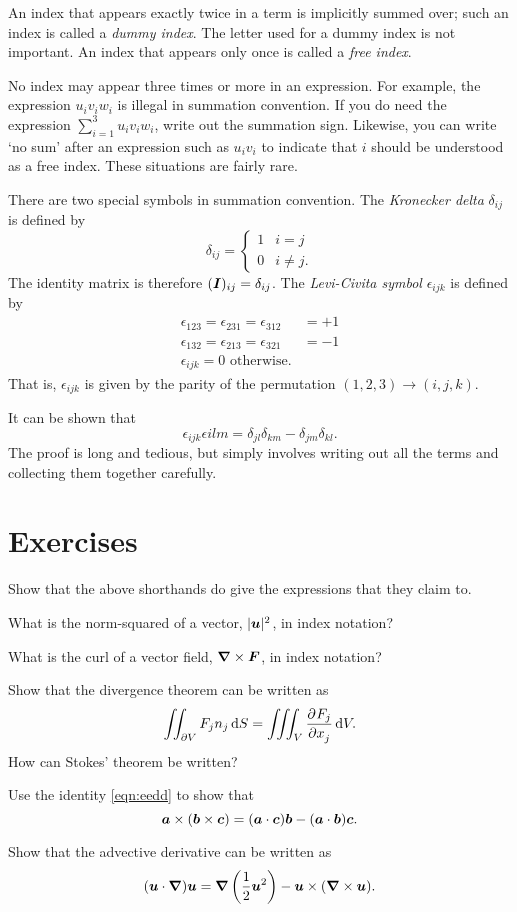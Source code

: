 \documentclass{article}
\begin{document}
An index that appears exactly twice in a term is implicitly summed over; such an index is called a \textit{dummy index}. The letter used for a dummy index is not important. An index that appears only once is called a \textit{free index}. 

No index may appear three times or more in an expression. For example, the expression $u_iv_iw_i$ is illegal in summation convention. If you do need the expression $\sum_{i=1}^3 u_iv_iw_i$, write out the summation sign. Likewise, you can write `no sum' after an expression such as $u_i v_i$ to indicate that $i$ should be understood as a free index. These situations are fairly rare.

There are two special symbols in summation convention. The \textit{Kronecker delta} $\delta_{ij}$ is defined by
\begin{equation}
 \delta_{ij} = \begin{cases}
  1 & i = j \\
  0 & i\neq j.
 \end{cases}
\end{equation}
The identity matrix is therefore $(\boldsymbol{I})_{ij} = \delta_{ij}$. The \textit{Levi-Civita symbol} $\epsilon_{ijk}$ is defined by 
\begin{align}
    \epsilon_{123} = \epsilon_{231} = \epsilon_{312} &= +1 \\
    \epsilon_{132} = \epsilon_{213} = \epsilon_{321} &= -1 \\
    \epsilon_{ijk} = 0 \text{ otherwise.}
\end{align}
That is, $\epsilon_{ijk}$ is given by the parity of the permutation $(1,2,3)\rightarrow(i,j,k)$. 

It can be shown that 
\begin{equation} \label{eqn:eedd}
 \epsilon_{ijk}\epsilon{ilm} = \delta_{jl}\delta_{km} - \delta_{jm}\delta_{kl}. 
\end{equation}
The proof is long and tedious, but simply involves writing out all the terms and collecting them together carefully. 

\section*{Exercises}

Show that the above shorthands do give the expressions that they claim to.

What is the norm-squared of a vector, $|\boldsymbol{u}|^2$, in index notation?

What is the curl of a vector field, $\boldsymbol{\nabla}\times\boldsymbol{F}$, in index notation?

Show that the divergence theorem can be written as
$$ \iint_{\partial V} F_j n_j \dif S = \iiint_V \dpd{F_j}{x_j} \dif V. $$
How can Stokes' theorem be written?

Use the identity \ref{eqn:eedd} to show that
$$ \boldsymbol{a}\times(\boldsymbol{b}\times\boldsymbol{c}) = (\boldsymbol{a}\cdot\boldsymbol{c})\boldsymbol{b} - (\boldsymbol{a}\cdot\boldsymbol{b})\boldsymbol{c}. $$

Show that the advective derivative can be written as 
$$ (\boldsymbol{u}\cdot\boldsymbol{\nabla})\boldsymbol{u} = \boldsymbol{\nabla}\left(\frac{1}{2}\boldsymbol{u}^2\right) - \boldsymbol{u}\times(\boldsymbol{\nabla}\times\boldsymbol{u}). $$
\end{document}
